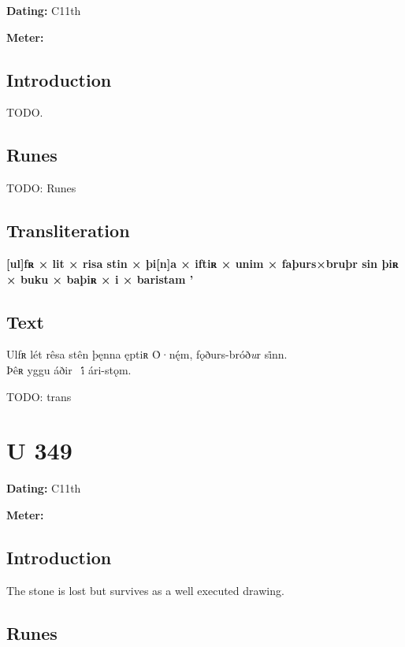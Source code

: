 \begin{flushright}%
\textbf{Dating:} C11th

\textbf{Meter:} \Fornyrdislag
\end{flushright}%

\subsection{Introduction}

TODO.

\subsection{Runes}

TODO: Runes%

\subsection{Transliteration}

\textbf{[ul]fʀ × lit × risa stin × þi[n]a × iftiʀ × unim × faþurs×bruþr sin þiʀ × buku × baþiʀ × i × baristam ’}

\subsection{Text}

\bpg\bpa[0]%
\startsub Ulfʀ lét rêsa stên þęnna ęptiʀ Ȯ·nę́m, fǫðurs-bróð\emph{u}r si̇nn.\endsub \\
Þêʀ yggu áðir \hld\ i̇́ ári-stǫm.\epa

\bpb TODO: trans\epb\epg

\sectionline\clearpage


\section{U 349}

\begin{flushright}%
\textbf{Dating:} C11th

\textbf{Meter:} \Fornyrdislag
\end{flushright}%

\subsection{Introduction}

The stone is lost but survives as a well executed drawing.

\subsection{Runes}

